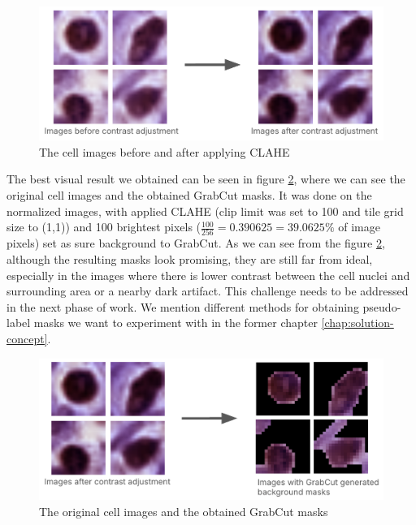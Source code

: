 \begin{figure}[H]
    \begin{centering}
    \includegraphics[width=14cm]{assets/images/work-cont-adj.png}
    \par\end{centering}
    \caption{The cell images before and after applying CLAHE}
    \label{fig:work-clahe}
\end{figure}

The best visual result we obtained can be seen in figure \ref{fig:work-grabcut}, where we can see the original cell images and the obtained GrabCut masks. It was done on the normalized images, with applied CLAHE (clip limit was set to 100 and tile grid size to (1,1)) and 100 brightest pixels ($\frac{100}{256} = 0.390625 = 39.0625\%$ of image pixels) set as sure background to GrabCut. As we can see from the figure \ref{fig:work-grabcut}, although the resulting masks look promising, they are still far from ideal, especially in the images where there is lower contrast between the cell nuclei and surrounding area or a nearby dark artifact. This challenge needs to be addressed in the next phase of work. We mention different methods for obtaining pseudo-label masks we want to experiment with in the former chapter \ref{chap:solution-concept}. 

\begin{figure}[H]
    \begin{centering}
    \includegraphics[width=14cm]{assets/images/work-grabcut-result.png}
    \par\end{centering}
    \caption{The original cell images and the obtained GrabCut masks}
    \label{fig:work-grabcut}
\end{figure}